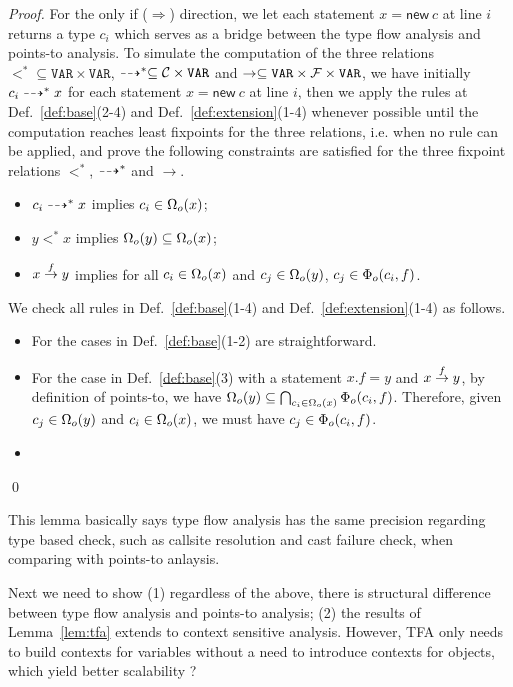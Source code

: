 \documentclass{llncs}
\newcommand{\keyword}[1]{\mathsf{#1}}
\newcommand{\kwnew}[0]{\keyword{new}}
\newcommand\Var{\mathtt{VAR}}
\begin{document}
\begin{proof}
For the only if ($\Rightarrow$) direction, we let each statement $x=\kwnew\ c$ at line $i$ returns a type $c_i$ which serves as 
a bridge between the type flow analysis and points-to analysis. To simulate the computation of the three relations
$\less^*\subseteq\Var\times\Var$, $\tflow^*\subseteq\Class\times\Var$ and $\rightarrow\subseteq\Var\times\Field\times\Var$, we have
initially $c_i\dashrightarrow^* x$ for each statement $x = \kwnew\ c$ at line $i$, then we apply the rules at Def.~\ref{def:base}(2-4) and 
Def.~\ref{def:extension}(1-4) whenever possible until the computation reaches least fixpoints for the three relations, i.e. when no rule can
be applied, and prove the following constraints are satisfied for the three fixpoint relations $\less^*$, $\dashrightarrow^*$ and 
$\rightarrow$. \begin{itemize}
\item $c_i\dashrightarrow^* x$ implies $c_i\in\Omega_o(x)$; 
\item $y\less^* x$ implies $\Omega_o(y)\subseteq\Omega_o(x)$;
\item $x\stackrel{f}{\rightarrow}y$ implies for all $c_i\in\Omega_o(x)$ and $c_j\in\Omega_o(y)$, $c_j\in\Phi_o(c_i,f)$.
\end{itemize}
We check all rules in Def.~\ref{def:base}(1-4) and Def.~\ref{def:extension}(1-4) as follows.
\begin{itemize}
\item For the cases in Def.~\ref{def:base}(1-2) are straightforward. 
\item For the case in Def.~\ref{def:base}(3) with a statement $x.f = y$ and $x\stackrel{f}{\rightarrow}y$, by definition of points-to, we have 
      $\Omega_o(y)\subseteq\bigcap_{c_i\in\Omega_o(x)}\Phi_o(c_i,f)$. Therefore, given $c_j\in\Omega_o(y)$ and $c_i\in\Omega_o(x)$, we must
      have $c_j\in\Phi_o(c_i,f)$.
\item {}
\end{itemize}
\qed
\end{proof}
This lemma basically says type flow analysis has the same precision regarding type based check, such as callsite resolution and cast failure check,
when comparing with points-to anlaysis.

Next we need to show (1) regardless of the above, there is structural difference between type flow analysis and points-to analysis;
(2) the results of Lemma~\ref{lem:tfa} extends to context sensitive analysis.
However, TFA only needs to build contexts for variables without a need to introduce contexts for objects, which
yield better scalability ?
\end{document}
